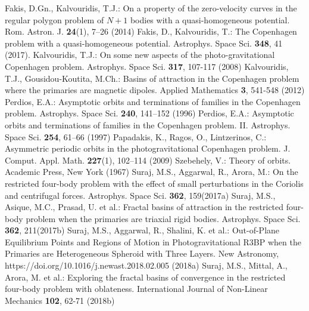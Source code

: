 \documentclass[preprint,fleqn,5p,numbers,sort&compress]{elsarticle}
\begin{document}
\begin{thebibliography}{}
 Fakis, D.Gn., Kalvouridis, T.J.: On a property of the zero-velocity curves in the regular polygon problem of $N + 1$ bodies with a quasi-homogeneous potential. Rom. Astron. J. \textbf{24}(1), 7--26 (2014)
 Fakis,  D., Kalvouridis, T.: The Copenhagen problem with a quasi-homogeneous potential. Astrophys. Space Sci. \textbf{348}, 41 (2017).
 Kalvouridis, T.J.: On some new aspects of the photo-gravitational Copenhagen problem. Astrophys. Space Sci. \textbf{317}, 107-117 (2008)
 Kalvouridis, T.J., Gousidou-Koutita, M.Ch.: Basins of attraction in the Copenhagen problem where the primaries are magnetic dipoles. Applied
Mathematics \textbf{3}, 541-548 (2012)
Perdios, E.A.: Asymptotic orbits and terminations of families in the Copenhagen problem. Astrophys. Space Sci. \textbf{240}, 141–152
(1996)
Perdios, E.A.: Asymptotic orbits and terminations of families in the Copenhagen problem. II. Astrophys. Space Sci. \textbf{254}, 61--66 (1997)
 Papadakis, K., Ragos, O., Lintzerinos, C.: Asymmetric periodic orbits in the photogravitational Copenhagen problem. J. Comput. Appl.
Math. \textbf{227}(1), 102--114 (2009)
Szebehely, V.: Theory of orbits. Academic Press, New York (1967)
 Suraj, M.S.,
    Aggarwal, R.,    Arora, M.: On the restricted four-body problem  with the effect of small perturbations in the Coriolis and centrifugal forces.  Astrophys. Space Sci. \textbf{362}, 159(2017a)
 Suraj, M.S., Asique, M.C., Prasad, U. et al.: Fractal basins of attraction in the restricted four-body problem when the primaries are triaxial rigid bodies.  Astrophys. Space Sci. \textbf{362}, 211(2017b)
 Suraj, M.S., Aggarwal, R., Shalini, K. et al.: Out-of-Plane Equilibrium Points and Regions of Motion in Photogravitational R3BP when the Primaries are Heterogeneous Spheroid with Three Layers.  New Astronomy, https://doi.org/10.1016/j.newast.2018.02.005 (2018a)
 Suraj, M.S., Mittal, A., Arora, M. et al.: Exploring the fractal basins of convergence in the restricted four-body problem with oblateness.  International Journal of Non-Linear Mechanics \textbf{102}, 62-71 (2018b)

\end{thebibliography}
\end{document}
